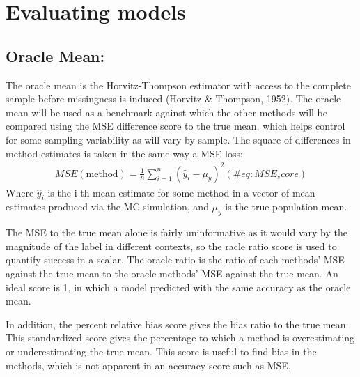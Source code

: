 \documentclass[12pt,twoside]{reedthesis}
\begin{document}
\section{Evaluating models}\label{evaluating-models}

\subsection{Oracle Mean:}\label{oracle-mean}

The oracle mean \label{eq:HTE} is the Horvitz-Thompson estimator with access
to the complete sample before missingness is induced (Horvitz \&
Thompson, 1952). The oracle mean will be used as a benchmark against
which the other methods will be compared using the MSE difference score
to the true mean, which helps control for some sampling variability as
\label{eq:HTE} will vary by sample. The square of differences in method
estimates is taken in the same way a MSE loss:
\begin{align}
MSE(\text{method}) = \frac{1}{n} \sum_{i=1}^n (\hat{y}_i - \mu_y)^2 (\#eq:MSE_score)
\end{align}
Where \(\hat{y}_i\) is the i-th mean estimate for some method in a
vector of mean estimates produced via the MC simulation, and \(\mu_y\)
is the true population mean.

The MSE to the true mean alone is fairly uninformative as it would vary
by the magnitude of the label in different contexts, so the racle ratio
score is used to quantify success in a scalar. The oracle ratio is the
ratio of each methods' MSE against the true mean to the oracle methods'
MSE against the true mean. An ideal score is 1, in which a model
predicted with the same accuracy as the oracle mean.

In addition, the percent relative bias score gives the bias ratio to the
true mean. This standardized score gives the percentage to which a
method is overestimating or underestimating the true mean. This score is
useful to find bias in the methods, which is not apparent in an accuracy
score such as MSE.
\end{document}

